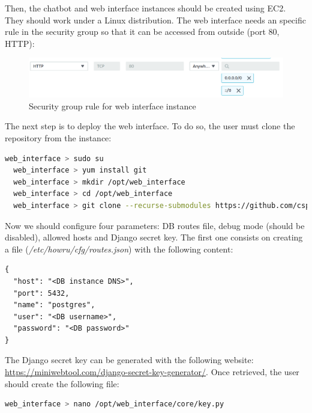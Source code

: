 \documentclass[12pt,english]{article}
\begin{document}
Then, the chatbot and web interface instances should be created using EC2. They should work under a Linux distribution. The web interface needs an specific rule in the security group so that it can be accessed from outside (port 80, HTTP):

\begin{figure}[H]
  \centering
  \includegraphics[width=\textwidth]{web_int_sg.png}
  \caption{Security group rule for web interface instance}
\end{figure}

The next step is to deploy the web interface. To do so, the user must clone the repository from the instance:

\begin{lstlisting}[mathescape=false, language=bash, caption={Commands to download web interface repository}, captionpos=b]
  web_interface > sudo su
  web_interface > yum install git
  web_interface > mkdir /opt/web_interface
  web_interface > cd /opt/web_interface
  web_interface > git clone --recurse-submodules https://github.com/csp98/howru_web_interface.git .
\end{lstlisting}

Now we should configure four parameters: DB routes file, debug mode (should be disabled), allowed hosts and Django secret key. The first one consists on creating a file (\emph{/etc/howru/cfg/routes.json}) with the following content:

\begin{lstlisting}[caption={Routes file}, captionpos=b]
{
  "host": "<DB instance DNS>",
  "port": 5432,
  "name": "postgres",
  "user": "<DB username>",
  "password": "<DB password>"
}
\end{lstlisting}

The Django secret key can be generated with the following website: \href{https://miniwebtool.com/django-secret-key-generator/}{https://miniwebtool.com/django-secret-key-generator/}. Once retrieved, the user should create the following file:

\begin{lstlisting}[mathescape=false, language=bash, caption={Command to create Django key file}, captionpos=b]
  web_interface > nano /opt/web_interface/core/key.py
\end{lstlisting}
\end{document}
